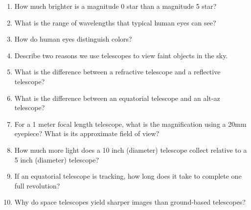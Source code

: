 
\begin{enumerate}
\item How much brighter is a magnitude 0 star than a magnitude 5 star?
\vspace{80pt}
\item What is the range of wavelengths that typical human eyes can see?
\vspace{80pt}
\item How do human eyes distinguish colors?
\vspace{80pt}
\item Describe two reasons we use telescopes to view faint objects in
  the sky.
\vspace{80pt}
\item  What is the difference between a refractive telescope and a
  reflective telescope?
\vspace{80pt}
\item  What is the difference between an equatorial telescope and an
  alt-az telescope?
\vspace{80pt}
\item For a 1 meter focal length telescope, what is the magnification
  using a 20mm eyepiece? What is its approximate field of view?
\vspace{80pt}
\item How much more light does a 10 inch (diameter) telescope collect relative to
  a 5 inch (diameter) telescope?
\vspace{80pt}
\item If an equatorial telescope is tracking, how long does it take to
  complete one full revolution? 
\vspace{80pt}
\item Why do space telescopes yield sharper images than ground-based
  telescopes?
\vspace{80pt}
\end{enumerate}
